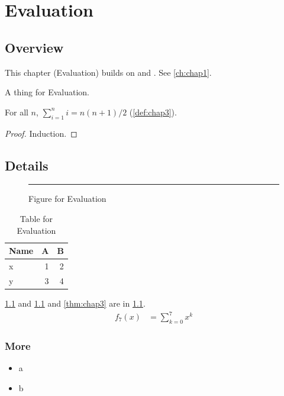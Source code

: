 \chapter{Evaluation}\label{ch:chap3}
\section{Overview}\label{sec:chap3:o}
This chapter (Evaluation) builds on \citet{knuth84} and \citep{cousot77,lamport94}. See \cref{ch:chap1}.
\begin{definition}\label{def:chap3}A thing for Evaluation.\end{definition}
\begin{theorem}\label{thm:chap3}For all $n$, $\sum_{i=1}^n i = n(n+1)/2$ (\cref{def:chap3}).\end{theorem}
\begin{proof}Induction.\end{proof}
\section{Details}
\begin{figure}[ht]\centering\rule{5cm}{3cm}\caption{Figure for Evaluation}\label{fig:chap3}\end{figure}
\begin{table}[ht]\centering\caption{Table for Evaluation}\label{tab:chap3}\begin{tabular}{lrr}\toprule Name&A&B\\\midrule x&1&2\\ y&3&4\\\bottomrule\end{tabular}\end{table}
\cref{fig:chap3} and \cref{tab:chap3} and \cref{thm:chap3} are in \cref{sec:chap3:o}.
\begin{align}f_{7}(x)&=\sum_{k=0}^{7}x^k\label{eq:chap3}\end{align}
\subsection{More}\begin{itemize}\item a\item b\end{itemize}
